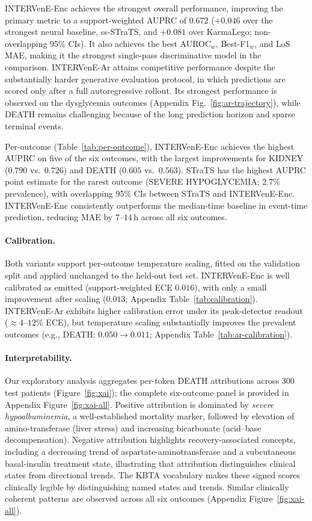 \documentclass[letterpaper]{article} %
\begin{document}
INTERVenE-Enc achieves the strongest overall performance, improving the primary metric to a support-weighted AUPRC of $0.672$ ($+0.046$ over the strongest neural baseline, ss-STraTS, and $+0.081$ over KarmaLego; non-overlapping 95\% CIs). It also achieves the best AUROC$_w$, Best-F1$_w$, and LoS MAE, making it the strongest single-pass discriminative model in the comparison. INTERVenE-Ar attains competitive performance despite the substantially harder generative evaluation protocol, in which predictions are scored only after a full autoregressive rollout. Its strongest performance is observed on the dysglycemia outcomes (Appendix Fig.~\ref{fig:ar-trajectory}), while DEATH remains challenging because of the long prediction horizon and sparse terminal events.

Per-outcome (Table~\ref{tab:per-outcome}), INTERVenE-Enc achieves the highest AUPRC on five of the six outcomes, with the largest improvements for KIDNEY ($0.790$ vs.\ $0.726$) and DEATH ($0.605$ vs.\ $0.563$). STraTS has the highest AUPRC point estimate for the rarest outcome (SEVERE HYPOGLYCEMIA; $2.7$\% prevalence), with overlapping 95\% CIs between STraTS and INTERVenE-Enc. INTERVenE-Enc consistently outperforms the median-time baseline in event-time prediction, reducing MAE by $7$--$14$\,h across all six outcomes.

\paragraph{Calibration.}
Both variants support per-outcome temperature scaling, fitted on the validation split and applied unchanged to the held-out test set. INTERVenE-Enc is well calibrated as emitted (support-weighted ECE $0.016$), with only a small improvement after scaling ($0.013$; Appendix Table~\ref{tab:calibration}). INTERVenE-Ar exhibits higher calibration error under its peak-detector readout ($\approx4$--$12\%$ ECE), but temperature scaling substantially improves the prevalent outcomes (e.g., DEATH: $0.050 \rightarrow 0.011$; Appendix Table~\ref{tab:ar-calibration}).

\paragraph{Interpretability.}
Our exploratory analysis aggregates per-token DEATH attributions across 300 test patients (Figure~\ref{fig:xai}); the complete six-outcome panel is provided in Appendix Figure~\ref{fig:xai-all}. Positive attribution is dominated by \emph{severe hypoalbuminemia}, a well-established mortality marker, followed by elevation of amino-transferase (liver stress) and increasing bicarbonate (acid--base decompensation). Negative attribution highlights recovery-associated concepts, including a decreasing trend of aspartate-aminotransferase and a subcutaneous basal-insulin treatment state, illustrating that attribution distinguishes clinical states from directional trends. The KBTA vocabulary makes these signed scores clinically legible by distinguishing named states and trends. Similar clinically coherent patterns are observed across all six outcomes (Appendix Figure~\ref{fig:xai-all}).
\end{document}

